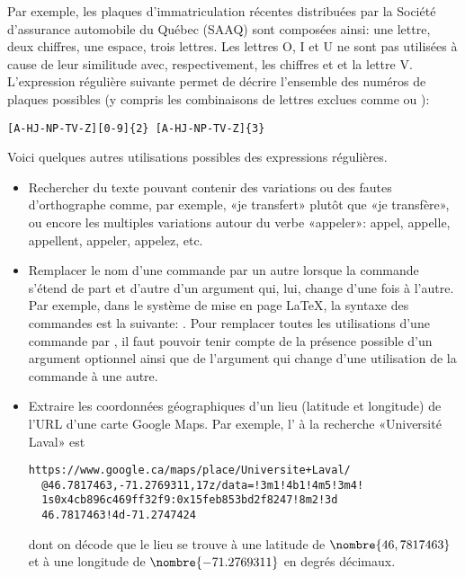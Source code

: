 Par exemple, les plaques d'immatriculation récentes distribuées par la
Société d'assurance automobile du Québec (SAAQ) sont composées ainsi:
une lettre, deux chiffres, une espace, trois lettres. Les lettres
\textsf{O}, \textsf{I} et \textsf{U} ne sont pas utilisées à cause de
leur similitude avec, respectivement, les chiffres {} et
{} et la lettre \textsf{V}. L'expression régulière suivante
permet de décrire l'ensemble des numéros de plaques possibles (y
compris les combinaisons de lettres exclues comme  ou
):
\begin{Schunk}
\begin{Verbatim}
[A-HJ-NP-TV-Z][0-9]{2} [A-HJ-NP-TV-Z]{3}
\end{Verbatim}
\end{Schunk}

Voici quelques autres utilisations possibles des expressions
régulières.
\begin{itemize}
\item Rechercher du texte pouvant contenir des variations ou des
  fautes d'orthographe comme, par exemple, «je transfert» plutôt que
  «je transfère», ou encore les multiples variations autour du verbe
  «appeler»: appel, appelle, appellent, appeler, appelez, etc.
\item Remplacer le nom d'une commande par un autre lorsque la commande
  s'étend de part et d'autre d'un argument qui, lui, change d'une fois
  à l'autre. Par exemple, dans le système de mise en page {\LaTeX}, la
  syntaxe des commandes est la suivante:
  \cmdprint{\cmd}. Pour remplacer toutes les
  utilisations d'une commande \cmdprint{\foo} par \cmdprint{\bar}, il
  faut pouvoir tenir compte de la présence possible d'un argument
  optionnel  ainsi que de l'argument  qui
  change d'une utilisation de la commande à une autre.
\item Extraire les coordonnées géographiques d'un lieu (latitude et
  longitude) de l'URL d'une carte Google Maps. Par exemple, l'%
   à la recherche «Université Laval» est
  \begin{Schunk}
\begin{Verbatim}
https://www.google.ca/maps/place/Universite+Laval/
  @46.7817463,-71.2769311,17z/data=!3m1!4b1!4m5!3m4!
  1s0x4cb896c469ff32f9:0x15feb853bd2f8247!8m2!3d
  46.7817463!4d-71.2747424
\end{Verbatim}
  \end{Schunk}
  dont on décode que le lieu se trouve à une latitude de
  $\nombre{46,7817463}$ et à une longitude de $\nombre{-71.2769311}$
  en degrés décimaux.
\end{itemize}


